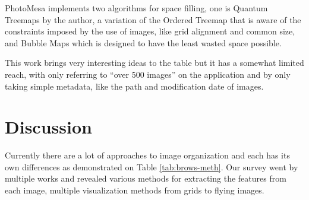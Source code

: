 PhotoMesa implements two algorithms for space filling, one is Quantum Treemaps by the author, a variation of the Ordered Treemap  that is aware of the constraints imposed by the use of images, like grid alignment and common size, and Bubble Maps which is designed to have the least wasted space possible.

This work brings very interesting ideas to the table but it has a somewhat limited reach, with only referring to ``over 500 images'' on the application and by only taking simple metadata, like the path and modification date of images.





\section{Discussion} %
\label{sub:discussion}


Currently there are a lot of approaches to image organization and each has its own differences as demonstrated on Table \ref{tab:brows-meth}. Our survey went by multiple works and revealed various methods for extracting the features from each image, multiple visualization methods from grids to flying images.


